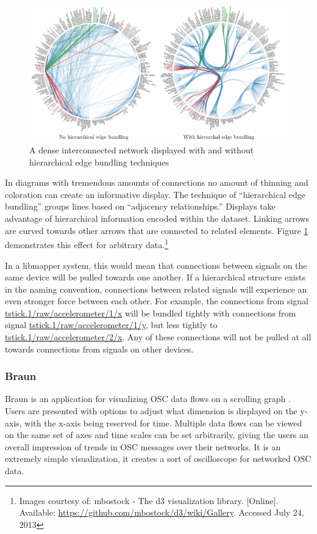 \begin{figure}[h]
\centering
	\includegraphics[width=\textwidth]{figures/heb}
\caption{A dense interconnected network displayed with and without hierarchical edge bundling techniques}
\label{fig:heb}
\end{figure}
In diagrams with tremendous amounts of connections no amount of thinning and coloration can create an informative display. The technique of ``hierarchical edge bundling'' \cite{HEB} groups lines based on ``adjacency relationships.'' Displays take advantage of hierarchical information encoded within the dataset. Linking arrows are curved towards other arrows that are connected to related elements. Figure \ref{fig:heb} demonstrates this effect for arbitrary data.\footnote{Images courtesy of: mbostock - The d3 visualization library. [Online]. Available: \url{https://github.com/mbostock/d3/wiki/Gallery}. Accessed July 24, 2013} 

In a libmapper system, this would mean that connections between signals on the same device will be pulled towards one another. If a hierarchical structure exists in the naming convention, connections between related signals will experience an even stronger force between each other. For example, the connections from signal \url{tstick.1/raw/accelerometer/1/x} will be bundled tightly with connections from signal \url{tstick.1/raw/accelerometer/1/y}, but less tightly to \url{tstick.1/raw/accelerometer/2/x}. Any of these connections will not be pulled at all towards connections from signals on other devices.


	\subsubsection{Braun}

Braun is an application for visualizing OSC data flows on a scrolling graph \cite{braun}. Users are presented with options to adjust what dimension is displayed on the y-axis, with the x-axis being reserved for time. Multiple data flows can be viewed on the same set of axes and time scales can be set arbitrarily, giving the users an overall impression of trends in OSC messages over their networks. It is an extremely simple visualization, it creates a sort of oscilloscope for networked OSC data.

